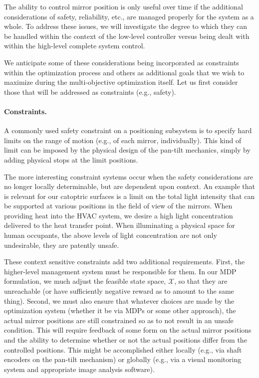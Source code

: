 The ability to control mirror position is only useful over time if
the additional considerations of safety, reliability, etc., are managed
properly for the system as a whole. To address these issues, we will
investigate the degree to which they can be handled within the context
of the low-level controller versus being dealt with within the high-level
complete system control.

We anticipate some of these considerations being incorporated as constraints
within the optimization process and others as additional goals that we
wish to maximize during the multi-objective optimization itself.  Let us
first consider those that will be addressed as constraints (e.g., safety).

\paragraph{Constraints.}
A commonly used safety constraint on a positioning subsystem is to
specify hard limits on the range of motion (e.g., of each mirror, individually).
This kind of limit can be imposed by the physical design of the pan-tilt
mechanics, simply by adding physical stops at the limit positions.

The more interesting constraint systems occur when the safety considerations
are no longer locally determinable, but are dependent upon context.
An example that is relevant for our catoptric surfaces is a limit on
the total light intensity that can be supported at various positions in the
field of view of the mirrors. When providing heat into the HVAC system,
we desire a high light concentration delivered to the heat transfer point.
When illuminating a physical space for human occupants, the above
levels of light concentration are not only undesirable, they are patently
unsafe.

These context sensitive constraints add two additional requirements.
First, the higher-level management system must be responsible for them.
In our MDP formulation, we much adjust the feasible state space, $\mathcal{X}$,
so that they are unreachable (or have sufficiently negative reward as to
amount to the same thing).
Second, we must also ensure that whatever choices are made by the optimization
system (whether it be via MDPs or some other approach), the actual
mirror positions are still constrained so as to not result in an
unsafe condition.  This will require feedback of some form on the actual
mirror positions and the ability to determine whether or not the actual
positions differ from the controlled positions.  This might be accomplished
either locally (e.g., via shaft encoders on the pan-tilt mechanism) or
globally (e.g., via a visual monitoring system and appropriate image analysis
software).


